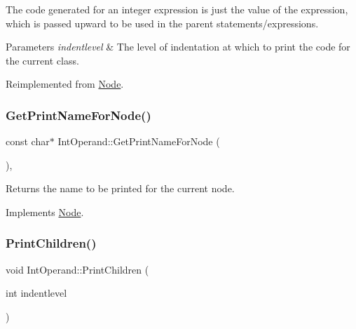 The code generated for an integer expression is just the value of the expression, which is passed upward to be used in the parent statements/expressions. 
\begin{DoxyParams}{Parameters}
{\em indentlevel} & The level of indentation at which to print the code for the current class. \\
\hline
\end{DoxyParams}


Reimplemented from \hyperlink{class_node_acb60e526730e8436056375a3055c2c32}{Node}.

\mbox{\label{class_int_operand_ab81268dfb4d2a7823ab860c5d9d9dc65}} 
\subsubsection{\texorpdfstring{Get\+Print\+Name\+For\+Node()}{GetPrintNameForNode()}}
{\footnotesize\ttfamily const char$\ast$ Int\+Operand\+::\+Get\+Print\+Name\+For\+Node (\begin{DoxyParamCaption}{ }\end{DoxyParamCaption})\hspace{0.3cm}{\ttfamily [inline]}, {\ttfamily [virtual]}}

Returns the name to be printed for the current node. 

Implements \hyperlink{class_node_a56e29657306ffb004d69c6929ae44269}{Node}.

\mbox{\label{class_int_operand_ac3a3845a17a1eb9a2c1e3ff631b8a400}} 
\subsubsection{\texorpdfstring{Print\+Children()}{PrintChildren()}}
{\footnotesize\ttfamily void Int\+Operand\+::\+Print\+Children (\begin{DoxyParamCaption}\item[{int}]{indentlevel }\end{DoxyParamCaption})\hspace{0.3cm}{\ttfamily [virtual]}}

